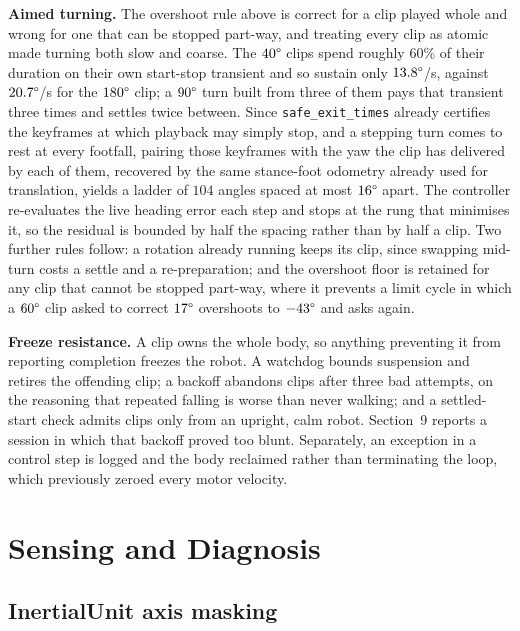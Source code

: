 \documentclass[twocolumn]{article}
\begin{document}
\textbf{Aimed turning.} The overshoot rule above is correct for a clip played whole and wrong
for one that can be stopped part-way, and treating every clip as atomic made turning both slow
and coarse. The $40\degree$ clips spend roughly $60\%$ of their duration on their own start-stop
transient and so sustain only $13.8\degree$/s, against $20.7\degree$/s for the $180\degree$
clip; a $90\degree$ turn built from three of them pays that transient three times and settles
twice between. Since \texttt{safe\_exit\_times} already certifies the keyframes at which
playback may simply stop, and a stepping turn comes to rest at every footfall, pairing those
keyframes with the yaw the clip has delivered by each of them, recovered by the same
stance-foot odometry already used for translation, yields a ladder of $104$ angles spaced at
most $16\degree$ apart. The controller re-evaluates the live heading error each step and stops at the
rung that minimises it, so the residual is bounded by half the spacing rather than by half a
clip. Two further rules follow: a rotation already running keeps its clip, since swapping
mid-turn costs a settle and a re-preparation; and the overshoot floor is retained for any clip
that cannot be stopped part-way, where it prevents a limit cycle in which a $60\degree$ clip
asked to correct $17\degree$ overshoots to $-43\degree$ and asks again.

\textbf{Freeze resistance.} A clip owns the whole body, so anything preventing it from
reporting completion freezes the robot. A watchdog bounds suspension and retires the offending
clip; a backoff abandons clips after three bad attempts, on the reasoning that repeated falling
is worse than never walking; and a settled-start check admits clips only from an upright, calm
robot. Section~9 reports a session in which that backoff proved too blunt. Separately, an
exception in a control step is logged and the body reclaimed rather than terminating the loop,
which previously zeroed every motor velocity.

\section{Sensing and Diagnosis}

\subsection{InertialUnit axis masking}
\label{sec:imu}
\end{document}
